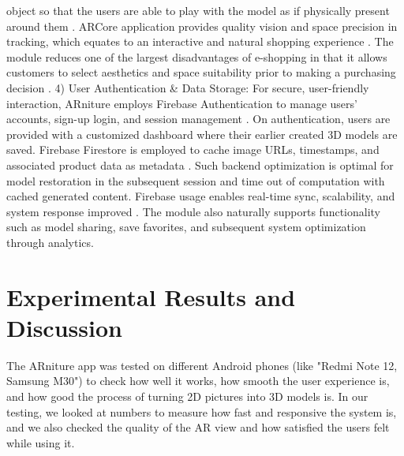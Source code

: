 \documentclass[12pt, a4paper]{article}
\begin{document}
object so that the users are able to play with the model as if physically present around them \cite{ref7}. ARCore application provides quality vision and space precision in tracking, which equates to an interactive and natural shopping experience \cite{ref16}. The module reduces one of the largest disadvantages of e-shopping in that it allows customers to select aesthetics and space suitability prior to making a purchasing decision \cite{ref11,ref13}. 4) User Authentication \& Data Storage: For secure, user-friendly interaction, ARniture employs Firebase Authentication to manage users' accounts, sign-up login, and session management \cite{ref4,ref18}. On authentication, users are provided with a customized dashboard where their earlier created 3D models are saved. Firebase Firestore is employed to cache image URLs, timestamps, and associated product data as metadata \cite{ref19}. Such backend optimization is optimal for model restoration in the subsequent session and time out of computation with cached generated content. Firebase usage enables real-time sync, scalability, and system response improved \cite{ref10}. The module also naturally supports functionality such as model sharing, save favorites, and subsequent system optimization through analytics.

\section{Experimental Results and Discussion}
The ARniture app was tested on different Android phones (like "Redmi Note 12, Samsung M30") to check how well it works, how smooth the user experience is, and how good the process of turning 2D pictures into 3D models is. In our testing, we looked at numbers to measure how fast and responsive the system is, and we also checked the quality of the AR view and how satisfied the users felt while using it.
\end{document}
